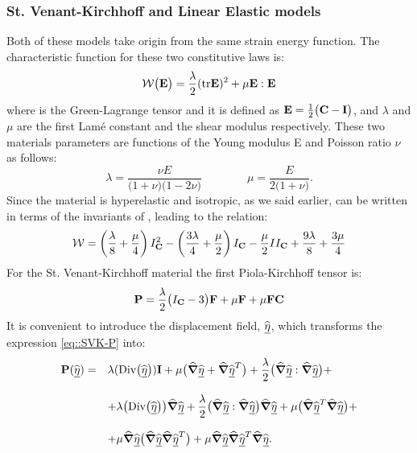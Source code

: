 \subsubsection{St. Venant-Kirchhoff and Linear Elastic models} Both of
these models take origin from the same strain energy function. The
characteristic function \W for these two constitutive laws is:
\begin{equation}
  \mathcal{W}\big(\textbf{E}\big)=\frac{\lambda}{2}(\text{tr}\textbf{E})^2 +
  \mu\textbf{E}:\textbf{E}
  \label{eq::W-SVKLE}
\end{equation}
where \Et is the Green-Lagrange tensor and it is
defined as $\textbf{E}=\frac{1}{2}\big(\textbf{C}-\textbf{I}\big)$, and $\lambda$ and
$\mu$ are the first Lam\'e constant and the shear modulus
respectively. These two materials parameters are functions of the
Young modulus E and Poisson ratio $\nu$ as follows:
\begin{equation}
  \lambda=\frac{\nu E}{\big(1+\nu \big)\big(1-2\nu
    \big)}\qquad\qquad \mu=\frac{E}{2\big(1+\nu\big)}.
  \label{eq::LameConst}
\end{equation}
Since the material is hyperelastic and isotropic, as we
said earlier, \W can be written in terms of the invariants of \C,
leading to the relation:
\begin{equation}
  \mathcal{W}=\left(\frac{\lambda}{8}+\frac{\mu}{4}\right)I_{\textbf{C}}^2 -
  \left(\frac{3\lambda}{4}+\frac{\mu}{2}\right)I_{\textbf{C}} -
  \frac{\mu}{2}II_{\textbf{C}}+\frac{9\lambda}{8}+\frac{3\mu}{4}
  \label{eq::WSVK-Inv}
\end{equation}
For the St. Venant-Kirchhoff material the first
Piola-Kirchhoff tensor is:
\begin{equation}
  \textbf{P} = \frac{\lambda}{2}\big(I_{\textbf{C}}-3\big)\textbf{F} +
  \mu\textbf{F} +\mu\textbf{F}\textbf{C}
  \label{eq::SVK-P}
\end{equation}
It is convenient to introduce the displacement field,
$\widehat{\underline{\eta}}$, which transforms the expression \eqref{eq::SVK-P} into:
\begin{equation}
  \begin{array}{llll} \textbf{P}(\widehat{\underline{\eta}}) = & \displaystyle
    \lambda(\text{Div}\big(\widehat{\underline{\eta}}\big))\textbf{I} + \mu\big(\widehat{\boldsymbol{\nabla}}\widehat{\underline{\eta}} +
    \widehat{\boldsymbol{\nabla}}\widehat{\underline{\eta}}^T\big)
    +\frac{\lambda}{2}\big(\widehat{\boldsymbol{\nabla}}\widehat{\underline{\eta}}:\widehat{\boldsymbol{\nabla}}\widehat{\underline{\eta}}\big)+ \\ \\ &
    \displaystyle + \lambda\big(\text{Div}\big(\widehat{\underline{\eta}}\big)\big)\widehat{\boldsymbol{\nabla}}\widehat{\underline{\eta}} +
    \frac{\lambda}{2}\big(\widehat{\boldsymbol{\nabla}}\widehat{\underline{\eta}}:\widehat{\boldsymbol{\nabla}}\widehat{\underline{\eta}}\big)\widehat{\boldsymbol{\nabla}}\widehat{\underline{\eta}} +
    \mu\big(\widehat{\boldsymbol{\nabla}}\widehat{\underline{\eta}}^T \widehat{\boldsymbol{\nabla}}\widehat{\underline{\eta}}\big)+\\ \\ & \displaystyle +
    \mu\widehat{\boldsymbol{\nabla}}\widehat{\underline{\eta}}\big(\widehat{\boldsymbol{\nabla}}\widehat{\underline{\eta}}\widehat{\boldsymbol{\nabla}}\widehat{\underline{\eta}}^T\big) +
    \mu\widehat{\boldsymbol{\nabla}}\widehat{\underline{\eta}}\widehat{\boldsymbol{\nabla}}\widehat{\underline{\eta}}^T\widehat{\boldsymbol{\nabla}}\widehat{\underline{\eta}}.
  \end{array}
  \label{eq::SVK-P-displ}
\end{equation}
